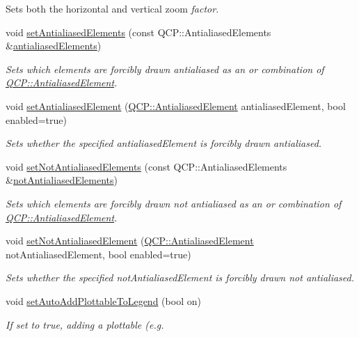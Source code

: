 \begin{DoxyCompactItemize}
\begin{DoxyCompactList}
Sets both the horizontal and vertical zoom {\itshape factor}. \end{DoxyCompactList}\item 
void \hyperlink{a00116_af6f91e5eab1be85f67c556e98c3745e8}{set\+Antialiased\+Elements} (const Q\+C\+P\+::\+Antialiased\+Elements \&\hyperlink{a00116_acc24388098ddb95f5a651cede3f34b99}{antialiased\+Elements})
\begin{DoxyCompactList}\small\item\em Sets which elements are forcibly drawn antialiased as an or combination of \hyperlink{a00143_ae55dbe315d41fe80f29ba88100843a0c}{Q\+C\+P\+::\+Antialiased\+Element}. \end{DoxyCompactList}\item 
void \hyperlink{a00116_aeef813bcf7efab8e765f9f87ec454691}{set\+Antialiased\+Element} (\hyperlink{a00143_ae55dbe315d41fe80f29ba88100843a0c}{Q\+C\+P\+::\+Antialiased\+Element} antialiased\+Element, bool enabled=true)
\begin{DoxyCompactList}\small\item\em Sets whether the specified {\itshape antialiased\+Element} is forcibly drawn antialiased. \end{DoxyCompactList}\item 
void \hyperlink{a00116_ae10d685b5eabea2999fb8775ca173c24}{set\+Not\+Antialiased\+Elements} (const Q\+C\+P\+::\+Antialiased\+Elements \&\hyperlink{a00116_ad611ed86732d07774545f5bd4b7f18b7}{not\+Antialiased\+Elements})
\begin{DoxyCompactList}\small\item\em Sets which elements are forcibly drawn not antialiased as an or combination of \hyperlink{a00143_ae55dbe315d41fe80f29ba88100843a0c}{Q\+C\+P\+::\+Antialiased\+Element}. \end{DoxyCompactList}\item 
void \hyperlink{a00116_afc657938a707c890e449ae89203a076d}{set\+Not\+Antialiased\+Element} (\hyperlink{a00143_ae55dbe315d41fe80f29ba88100843a0c}{Q\+C\+P\+::\+Antialiased\+Element} not\+Antialiased\+Element, bool enabled=true)
\begin{DoxyCompactList}\small\item\em Sets whether the specified {\itshape not\+Antialiased\+Element} is forcibly drawn not antialiased. \end{DoxyCompactList}\item 
void \hyperlink{a00116_ad8858410c2db47b7104040a3aa61c3fc}{set\+Auto\+Add\+Plottable\+To\+Legend} (bool on)
\begin{DoxyCompactList}\small\item\em If set to true, adding a plottable (e.\+g. \end{DoxyCompactList}\item 

\end{DoxyCompactItemize}
